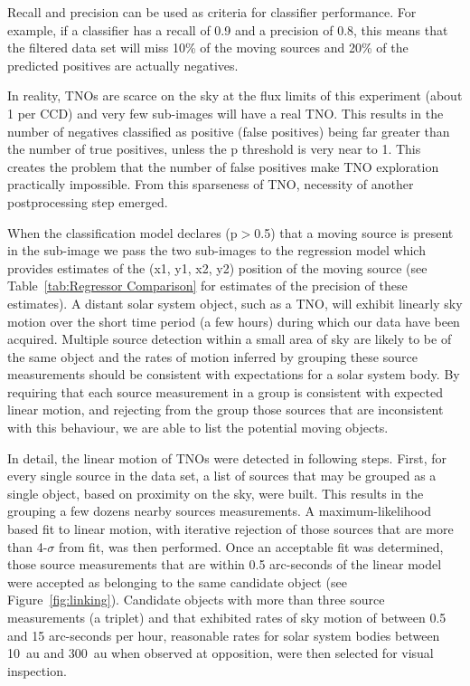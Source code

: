 Recall and precision can be used as criteria for classifier performance.
For example, if a classifier has a recall of 0.9 and a precision of 0.8, this means that the filtered data set will miss 10\% of the moving sources and 20\% of the predicted positives are actually negatives.

In reality, TNOs are scarce on the sky at the flux limits of this experiment (about 1 per CCD) and very few sub-images will have a real TNO. 
This results in the number of negatives classified as positive (false positives) being far greater than the number of true positives, unless the p threshold is very near to 1. 
This creates the problem that the number of false positives make TNO exploration practically impossible. 
From this sparseness of TNO, necessity of another postprocessing step emerged.

When the classification model declares (p$>$0.5) that a moving source is present in the sub-image we pass the two sub-images to the regression model which provides estimates of the (x1, y1, x2, y2) position of the moving source (see Table~\ref{tab:Regressor Comparison} for estimates of the precision of these estimates).
A distant solar system object, such as a TNO, will exhibit linearly sky motion over the short time period (a few hours) during which our data have been acquired. 
Multiple source detection within a small area of sky are likely to be of the same object and the rates of motion inferred by grouping these source measurements should be consistent with expectations for a solar system body. 
By requiring that each source measurement in a group is consistent with expected linear motion, and rejecting from the group those sources that are inconsistent with this behaviour, we are able to list the potential moving objects.

In detail, the linear motion of TNOs were detected in following steps.
First, for every single source in the data set, a list of sources that may be grouped as a single object, based on proximity on the sky, were built.
This results in the grouping a few dozens nearby sources measurements.
A maximum-likelihood based fit to linear motion, with iterative rejection of those sources that are more than 4-$\sigma$ from fit, was then performed.
Once an acceptable fit was determined, those source measurements that are within 0.5 arc-seconds of the linear model were accepted as belonging to the same candidate object (see Figure~\ref{fig:linking}).
Candidate objects with more than three source measurements (a triplet) and that exhibited rates of sky motion of between 0.5 and 15 arc-seconds per hour, reasonable rates for solar system bodies between 10~au and 300~au when observed at opposition, were then selected for visual inspection.

